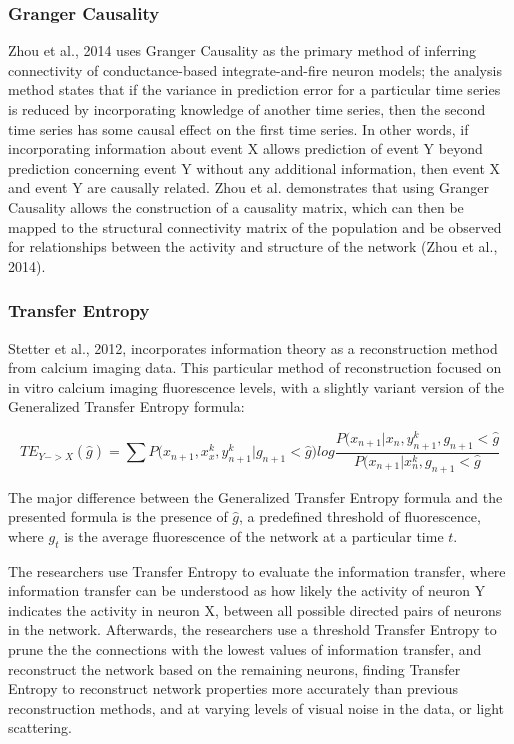 \documentclass[11pt,titlepage]{article}
\begin{document}
\subsubsection{Granger Causality}
Zhou et al., 2014 uses Granger Causality as the primary method of inferring connectivity of conductance-based integrate-and-fire neuron models; the analysis method states that if the variance in prediction error for a particular time series is reduced by incorporating knowledge of another time series, then the second time series has some causal effect on the first time series. In other words, if incorporating information about event X allows prediction of event Y beyond prediction concerning event Y without any additional information, then event X and event Y are causally related. Zhou et al. demonstrates that using Granger Causality allows the construction of a causality matrix, which can then be mapped to the structural connectivity matrix of the population and be observed for relationships between the activity and structure of the network (Zhou et al., 2014).\par

\subsubsection{Transfer Entropy}
Stetter et al., 2012, incorporates information theory as a reconstruction method from calcium imaging data. This particular method of reconstruction focused on in vitro calcium imaging fluorescence levels, with a slightly variant version of the Generalized Transfer Entropy formula:

$$TE_{Y->X}(\hat{g}) = \sum{P(x_{n+1}, x_x^k,y_{n+1}^k|g_{n+1}<\hat{g}}) log \frac{P(x_{n+1}|x_n,y_{n+1}^k,g_{n+1}<\hat{g}}{P(x_{n+1}|x_n^k,g_{n+1}<\hat{g}}$$

The major difference between the Generalized Transfer Entropy formula and the presented formula is the presence of $\hat{g}$, a predefined threshold of fluorescence, where $g_t$ is the average fluorescence of the network at a particular time $t$.\par

The researchers use Transfer Entropy to evaluate the information transfer, where information transfer can be understood as how likely the activity of neuron Y indicates the activity in neuron X, between all possible directed pairs of neurons in the network. Afterwards, the researchers use a threshold Transfer Entropy to prune the the connections with the lowest values of information transfer, and reconstruct the network based on the remaining neurons, finding Transfer Entropy to reconstruct network properties more accurately than previous reconstruction methods, and at varying levels of visual noise in the data, or light scattering.\par
\end{document}
